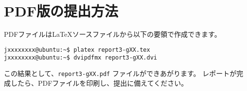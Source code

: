 \section{PDF版の提出方法}
PDFファイルは\LaTeX ソースファイルから以下の要領で作成できます。
\begin{screen}
\small
\begin{verbatim}
jxxxxxxxx@ubuntu:~$ platex report3-gXX.tex
jxxxxxxxx@ubuntu:~$ dvipdfmx report3-gXX.dvi
\end{verbatim}
\normalsize
\end{screen}
この結果として、\verb+report3-gXX.pdf+ ファイルができあがります。
レポートが完成したら、PDFファイルを印刷し、提出に備えてください。
